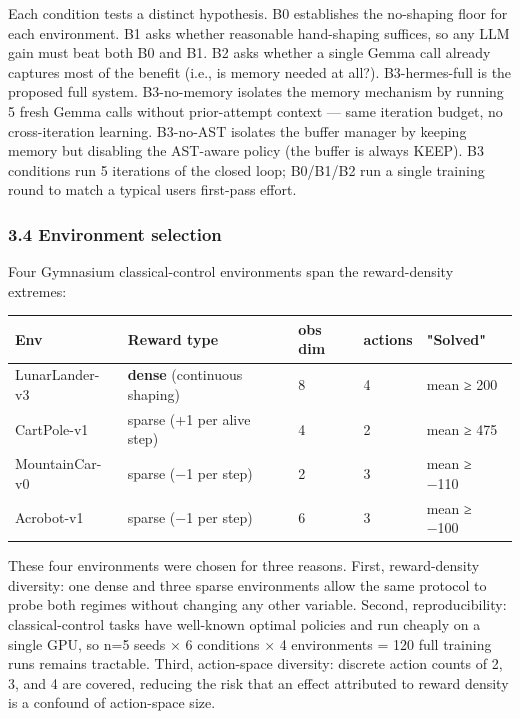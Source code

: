 Each condition tests a distinct hypothesis. B0 establishes the no-shaping floor for each environment. B1 asks whether reasonable hand-shaping suffices, so any LLM gain must beat both B0 and B1. B2 asks whether a single Gemma call already captures most of the benefit (i.e., is memory needed at all?). B3-hermes-full is the proposed full system. B3-no-memory isolates the memory mechanism by running 5 fresh Gemma calls without prior-attempt context --- same iteration budget, no cross-iteration learning. B3-no-AST isolates the buffer manager by keeping memory but disabling the AST-aware policy (the buffer is always KEEP). B3 conditions run 5 iterations of the closed loop; B0/B1/B2 run a single training round to match a typical user\textquotesingle s first-pass effort.

\subsubsection{3.4 Environment selection}\label{34-environment-selection}

Four Gymnasium classical-control environments span the reward-density extremes:

{\def\LTcaptype{none} %
\begin{longtable}[]{@{}lllll@{}}
\toprule\noalign{}
Env & Reward type & obs dim & actions & "Solved" \\
\midrule\noalign{}
\endhead
\bottomrule\noalign{}
\endlastfoot
LunarLander-v3 & \textbf{dense} (continuous shaping) & 8 & 4 & mean ≥ 200 \\
CartPole-v1 & sparse (+1 per alive step) & 4 & 2 & mean ≥ 475 \\
MountainCar-v0 & sparse (−1 per step) & 2 & 3 & mean ≥ −110 \\
Acrobot-v1 & sparse (−1 per step) & 6 & 3 & mean ≥ −100 \\
\end{longtable}
}

These four environments were chosen for three reasons. First, reward-density diversity: one dense and three sparse environments allow the same protocol to probe both regimes without changing any other variable. Second, reproducibility: classical-control tasks have well-known optimal policies and run cheaply on a single GPU, so n=5 seeds × 6 conditions × 4 environments = 120 full training runs remains tractable. Third, action-space diversity: discrete action counts of 2, 3, and 4 are covered, reducing the risk that an effect attributed to reward density is a confound of action-space size.

